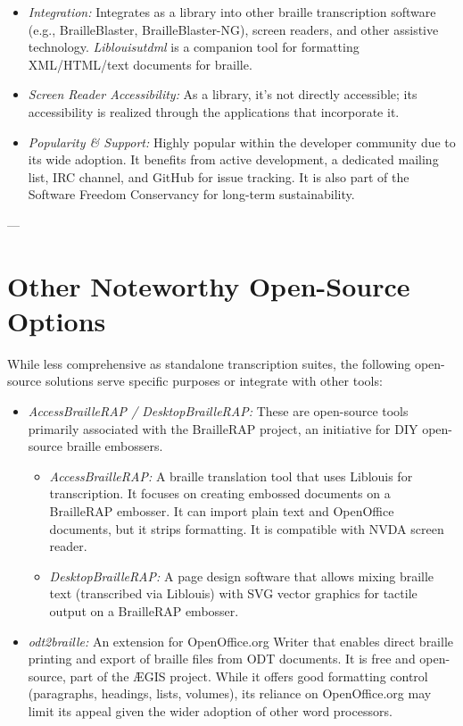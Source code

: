 \begin{itemize}
\begin{itemize}
        \item \emph{Integration:} Integrates as a library into other braille transcription software (e.g., BrailleBlaster, BrailleBlaster-NG), screen readers, and other assistive technology. \emph{Liblouisutdml} is a companion tool for formatting XML/HTML/text documents for braille.
        \item \emph{Screen Reader Accessibility:} As a library, it's not directly accessible; its accessibility is realized through the applications that incorporate it.
        \item \emph{Popularity \& Support:} Highly popular within the developer community due to its wide adoption. It benefits from active development, a dedicated mailing list, IRC channel, and GitHub for issue tracking. It is also part of the Software Freedom Conservancy for long-term sustainability.
    \end{itemize}
\end{itemize}

---

\section{Other Noteworthy Open-Source Options}
\label{sec:braille-other-open-source}
While less comprehensive as standalone transcription suites, the following open-source solutions serve specific purposes or integrate with other tools:

\begin{itemize}
    \item \emph{AccessBrailleRAP / DesktopBrailleRAP:} These are open-source tools primarily associated with the BrailleRAP project, an initiative for DIY open-source braille embossers.
    \begin{itemize}
        \item \emph{AccessBrailleRAP:} A braille translation tool that uses Liblouis for transcription. It focuses on creating embossed documents on a BrailleRAP embosser. It can import plain text and OpenOffice documents, but it strips formatting. It is compatible with NVDA screen reader\footnotemark{}.
        \item \emph{DesktopBrailleRAP:} A page design software that allows mixing braille text (transcribed via Liblouis) with SVG vector graphics for tactile output on a BrailleRAP embosser\footnotemark{}.
    \end{itemize}
    \item \emph{odt2braille:} An extension for OpenOffice.org Writer that enables direct braille printing and export of braille files from ODT documents. It is free and open-source, part of the ÆGIS project. While it offers good formatting control (paragraphs, headings, lists, volumes), its reliance on OpenOffice.org may limit its appeal given the wider adoption of other word processors\footnotemark{}.
\end{itemize}

